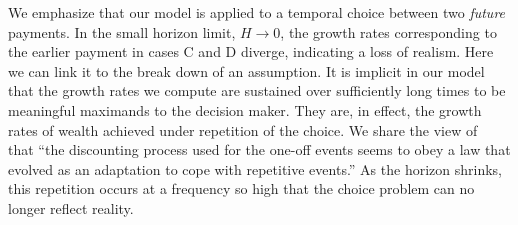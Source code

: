 We emphasize that our model is applied to a temporal choice between two {\it future} payments. In the small horizon limit, $H \to 0$, the growth rates corresponding to the earlier payment in cases C and D diverge, indicating a loss of realism. Here we can link it to the break down of an assumption. It is implicit in our model that the growth rates we compute are sustained over sufficiently long times to be meaningful maximands to the decision maker. They are, in effect, the growth rates of wealth achieved under repetition of the choice. We share the view of~\citet[p.~60]{Kacelnik1997} that ``the discounting process used for the one-off events seems to obey a law that evolved as an adaptation to cope with repetitive events.'' As the horizon shrinks, this repetition occurs at a frequency so high that the choice problem can no longer reflect reality.

